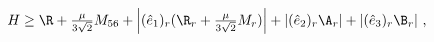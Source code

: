 \begin{equation}
H\geq \R+\textstyle{\frac{\mu}{3\sqrt{2}}}M_{56}+\left|(\hat{e}_{1})_{r}(\R_{r}+\textstyle{\frac{\mu}{3\sqrt{2}}}
M_{r})\right|+\left|(\hat{e}_{2})_{r}\A_{r}\right|+\left|(\hat{e}_{3})_{r}\B_{r}\right|\,,\label{Ebound}
\end{equation}

